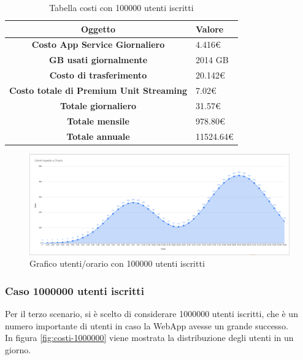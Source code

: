 \begin{table}[H]
    \label{tab:costi-100000}
    \begin{tabularx}{\textwidth}{|c|X|}
        \hline
        \textbf{Oggetto} & \textbf{Valore} \\\hline
        
        \textbf{Costo App Service Giornaliero} & {4.416€} \\ 
        \hline
        \textbf{GB usati giornalmente} & {2014 GB} \\ 
        \hline
        \textbf{Costo di trasferimento} & {20.142€}\\
        \hline
        \textbf{Costo totale di Premium Unit Streaming} & {7.02€}\\  
        \hline
        \textbf{Totale giornaliero} & {31.57€}\\  
        \hline
        \textbf{Totale mensile} & {978.80€}\\  
        \hline
        \textbf{Totale annuale} & {11524.64€}\\  
        \hline
    \end{tabularx}
    \caption{Tabella costi con 100000 utenti iscritti}
\end{table}
\begin{figure}[H]
    \centering
    \includegraphics[scale=0.25]{images/costi/100kuser.png}
    \caption{Grafico utenti/orario con 100000 utenti iscritti}
    \label{fig:costi-100000}
\end{figure}

\subsubsection{Caso 1000000 utenti iscritti}
Per il terzo scenario, si è scelto di considerare 1000000 utenti iscritti, che è un numero importante di utenti in caso la WebApp avesse un grande successo.\\
In figura \ref{fig:costi-1000000} viene mostrata la distribuzione degli utenti in un giorno.

